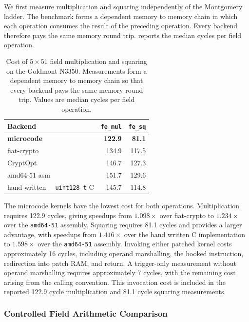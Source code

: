 \documentclass[journal=tches,submission]{iacrtrans}
\newcommand{\code}[1]{\texttt{#1}}
\begin{document}
We first measure multiplication and squaring independently of the Montgomery ladder.
The benchmark forms a dependent memory to memory chain in which each operation consumes the result of the preceding operation.
Every backend therefore pays the same memory round trip.
 reports the median cycles per field operation.

\begin{table}[htbp]
\centering
\caption{Cost of $5\times51$ field multiplication and squaring on the Goldmont N3350.
Measurements form a dependent memory to memory chain so that every backend pays the same memory round trip.
Values are median cycles per field operation.}
\label{tab:res-c25519-kernels}
\footnotesize
\setlength{\tabcolsep}{5pt}
\begin{tabular}{@{}lrr@{}}
\toprule
Backend & \code{fe\_mul} & \code{fe\_sq} \\
\midrule
\textbf{microcode} &
\textbf{122.9} &
\textbf{81.1} \\
fiat-crypto &
134.9 &
117.5 \\
CryptOpt &
146.7 &
127.3 \\
amd64-51 asm &
151.7 &
129.6 \\
hand written \code{\_\_uint128\_t} C &
145.7 &
114.8 \\
\bottomrule
\end{tabular}
\end{table}

The microcode kernels have the lowest cost for both operations.
Multiplication requires 122.9 cycles, giving speedups from $1.098\times$ over fiat-crypto to $1.234\times$ over the \texttt{amd64-51} assembly.
Squaring requires 81.1 cycles and provides a larger advantage, with speedups from $1.416\times$ over the hand written C implementation to $1.598\times$ over the \texttt{amd64-51} assembly.
Invoking either patched kernel costs approximately 16 cycles, including operand marshalling, the hooked instruction, redirection into patch RAM, and return.
A trigger-only measurement without operand marshalling requires approximately 7 cycles, with the remaining cost arising from the calling convention.
This invocation cost is included in the reported 122.9 cycle multiplication and 81.1 cycle squaring measurements.

\subsubsection{Controlled Field Arithmetic Comparison}
\label{sec:c25519-field-results}
\end{document}
